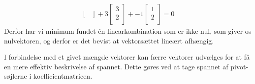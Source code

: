 \begin{eks}
\begin{align*}
\begin{bmatrix}
\end{bmatrix}
+ 3
\begin{bmatrix}
           3 \\
           2 \\
\end{bmatrix}
+ -1
\begin{bmatrix}
           1 \\
           2 \\
\end{bmatrix}
=0
\end{align*}
%
Derfor har vi minimum fundet én linearkombination som er ikke-nul, som giver os nulvektoren, og derfor er det bevist at vektorsættet lineært afhængig.
\end{eks}
%
%
I forbindelse med et givet mængde vektorer kan færre vektorer udvælges for at få en mere effektiv beskrivelse af spannet. Dette gøres ved at tage spannet af pivot-søjlerne i koefficientmatricen.
\\\\
%

